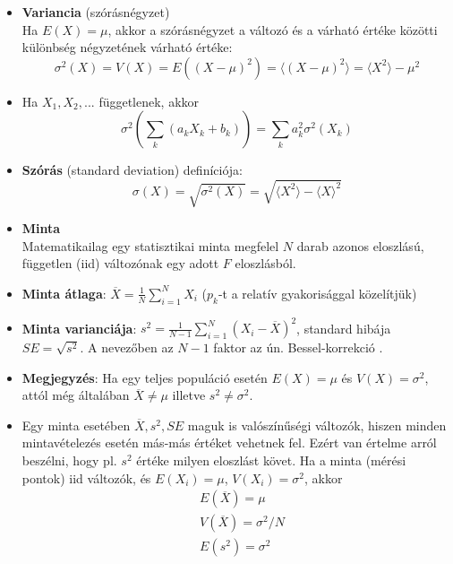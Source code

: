 \documentclass[12pt]{article}
\theoremstyle{plain}
\begin{document}
\begin{itemize}
\begin{itemize}
        \end{itemize}
    \item \textbf{Variancia} (szórásnégyzet)\\
    Ha $E(X)=\mu$, akkor a szórásnégyzet a változó és a várható értéke közötti különbség négyzetének várható értéke:
    \begin{equation*}
        \sigma^2(X) = V(X) = E((X-\mu)^2) = \langle (X-\mu)^2 \rangle = \langle X^2 \rangle - \mu^2
    \end{equation*}
    \item Ha $X_1, X_2, ...$ függetlenek, akkor 
        \begin{equation*}
            \sigma^2\left( \sum\limits_k(a_kX_k + b_k) \right) = \sum\limits_k a_k^2\sigma^2(X_k)
        \end{equation*}
    \item \textbf{Szórás} (standard deviation) definíciója:
        \begin{equation*}
            \sigma(X) = \sqrt{\sigma^2(X)} = \sqrt{\langle X^2 \rangle - \langle X \rangle^2}
        \end{equation*}
    \item \textbf{Minta}\\
    Matematikailag egy statisztikai minta megfelel $N$ darab azonos eloszlású, független (iid) változónak egy adott $F$ eloszlásból.
    \item \textbf{Minta átlaga}: ${\displaystyle\overline{X} = \frac{1}{N}\sum\limits_{i=1}^{N}X_i}$ ($p_k$-t a relatív gyakorisággal közelítjük)
    \item \textbf{Minta varianciája}: ${\displaystyle s^2 = \frac{1}{N-1}\sum\limits_{i=1}^{N}(X_i-\overline{X})^2}$,
    standard hibája $SE = \sqrt{s^2}$. A nevezőben az $N-1$ faktor az ún. Bessel-korrekció \cite{besselcorr}.
    \item \textbf{Megjegyzés}: Ha egy teljes populáció esetén $E(X)=\mu$ és $V(X)=\sigma^2$, attól még általában
    $\overline{X}\neq\mu$ illetve $s^2\neq\sigma^2$.
    \item Egy minta esetében $\overline{X}, s^2, SE$ maguk is valószínűségi változók, hiszen minden mintavételezés esetén más-más
    értéket vehetnek fel. Ezért van értelme arról beszélni, hogy pl. $s^2$ értéke milyen eloszlást követ.
    Ha a minta (mérési pontok) iid változók, és $E(X_i)=\mu$, $V(X_i)=\sigma^2$, akkor 
    \begin{align*}
        & E(\overline{X}) = \mu \\
        & V(\overline{X}) = \sigma^2/N \\
        & E(s^2) = \sigma^2
    \end{align*}
\end{itemize}
\end{document}
